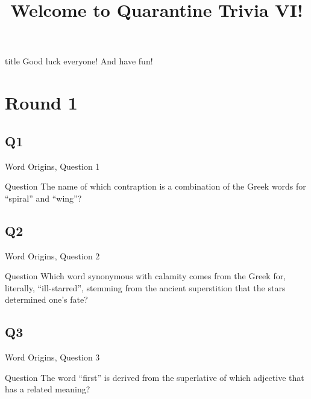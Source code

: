 \documentclass[11pt]{beamer}
\begin{document}
\title{Welcome to Quarantine Trivia VI!\vspace{-0.5in}}
\date{}

\begin{frame}
\titlepage{}
\end{frame}

\begingroup{}
\begin{frame}
\vfill{}
\begin{beamercolorbox}[sep=8pt,center,shadow=true,rounded=true]{title}
Good luck everyone! And have fun!
\end{beamercolorbox}
\vfill{}
\end{frame}
\endgroup{}
\def\thisSectionName{Word Origins}
\section{Round 1}
\subsection*{Q1}
\begin{frame}[t]{Word Origins, Question 1}
\begin{block}{Question}
The name of which contraption is a combination of the Greek words for ``spiral'' and ``wing''?
\end{block}
\end{frame}
\subsection*{Q2}
\begin{frame}[t]{Word Origins, Question 2}
\begin{block}{Question}
Which word synonymous with calamity comes from the Greek for, literally, ``ill-starred'', stemming from the ancient superstition that the stars determined one's fate?
\end{block}
\end{frame}
\subsection*{Q3}
\begin{frame}[t]{Word Origins, Question 3}
\begin{block}{Question}
The word ``first'' is derived from the superlative of which adjective that has a related meaning?
\end{block}
\end{frame}
\end{document}
